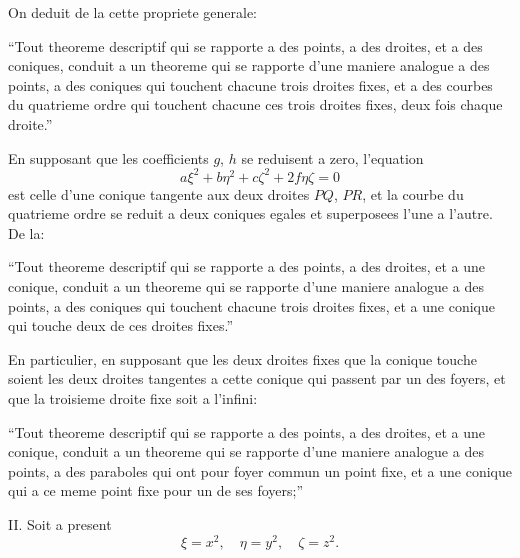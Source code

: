 \documentclass[11pt,a4paper]{book}
\begin{document}
On deduit de la cette propriete generale:

``Tout theoreme descriptif qui se rapporte a des points, a des droites, et a des coniques, conduit a un theoreme qui se rapporte d'une maniere analogue a des points, a des coniques qui touchent chacune trois droites fixes, et a des courbes du quatrieme ordre qui touchent chacune ces trois droites fixes, deux fois chaque droite.''

En supposant que les coefficients $g$, $h$ se reduisent a zero, l'equation
\[
a\xi^2 + b\eta^2 + c\zeta^2 + 2f\eta\zeta = 0
\]
est celle d'une conique tangente aux deux droites $PQ$, $PR$, et la courbe du quatrieme ordre se reduit a deux coniques egales et superposees l'une a l'autre. De la:

``Tout theoreme descriptif qui se rapporte a des points, a des droites, et a une conique, conduit a un theoreme qui se rapporte d'une maniere analogue a des points, a des coniques qui touchent chacune trois droites fixes, et a une conique qui touche deux de ces droites fixes.''

En particulier, en supposant que les deux droites fixes que la conique touche soient les deux droites tangentes a cette conique qui passent par un des foyers, et que la troisieme droite fixe soit a l'infini:

``Tout theoreme descriptif qui se rapporte a des points, a des droites, et a une conique, conduit a un theoreme qui se rapporte d'une maniere analogue a des points, a des paraboles qui ont pour foyer commun un point fixe, et a une conique qui a ce meme point fixe pour un de ses foyers;''

\textsc{II.} Soit a present
\[
\xi = x^2, \quad \eta = y^2, \quad \zeta = z^2.
\]
\end{document}
